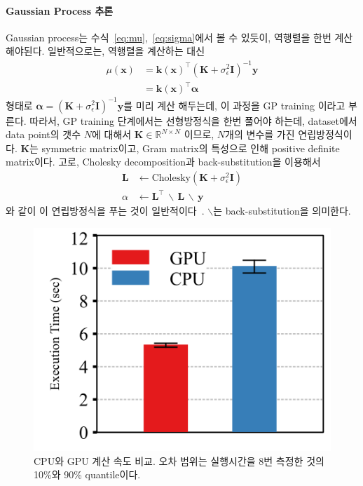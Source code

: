 \documentclass[ba]{imsart}
\newcommand{\vk}{\mathbf{k}}
\newcommand{\vx}{\mathbf{x}}
\newcommand{\vy}{\mathbf{y}}
\newcommand{\valpha}{\pmb{\alpha}}
\newcommand{\mI}{\mathbf{I}}
\newcommand{\mK}{\mathbf{K}}
\newcommand{\mL}{\mathbf{L}}
\begin{document}
\paragraph{Gaussian Process 추론}
Gaussian process는 수식~\eqref{eq:mu},~\eqref{eq:sigma}에서 볼 수 있듯이, 역행렬을 한번 계산해야된다.
일반적으로는, 역행렬을 계산하는 대신 
\begin{align}
  \mu(\vx) &= {\vk(\vx)}^{\top } {(\mK + \sigma^2_{\epsilon} \mI)}^{-1} \vy \\
  &= {\vk(\vx)}^{\top } \valpha
\end{align}
형태로 \( \valpha = {(\mK + \sigma^2_{\epsilon} \mI)}^{-1} \vy \)를 미리 계산 해두는데, 이 과정을 GP training 이라고 부른다.
따라서, GP training 단계에서는 선형방정식을 한번 풀어야 하는데, dataset에서 data point의 갯수 \(N\)에 대해서 \(\mK \in \mathbb{R}^{N \times N}\) 이므로, \(N\)개의 변수를 가진 연립방정식이다.
\(\mK\)는 symmetric matrix이고, Gram matrix의 특성으로 인해 positive definite matrix이다.
고로, Cholesky decomposition과 back-substitution을 이용해서
\begin{align}
  \mL    &\leftarrow \text{Cholesky}(\mK + \sigma^2_{\epsilon} \mI) \\
  \alpha &\leftarrow \mL^\top \, \backslash \, \mL  \, \backslash \, \vy \label{eq:alpha}
\end{align}
와 같이 이 연립방정식을 푸는 것이 일반적이다~\citep{rasmussen_gaussian_2006}.
\(\backslash\)는 back-substitution을 의미한다.

\begin{figure}[t]
  \centering
  \includegraphics[scale=0.7]{figures/exectime_01.png}
  \caption{CPU와 GPU 계산 속도 비교.
    오차 범위는 실행시간을 8번 측정한 것의 10\%와 90\% quantile이다.}\label{fig:exec_time}
\end{figure}
%
\end{document}
